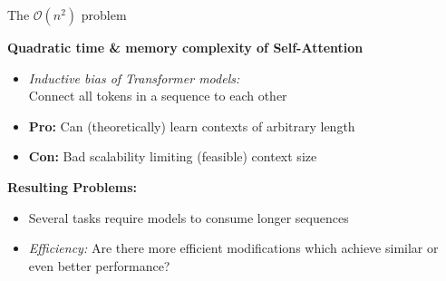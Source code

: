\documentclass[11pt,compress,t,notes=noshow, xcolor=table]{beamer}
\begin{document}


\begin{frame}{The $\mathcal{O}(n^2)$ problem}

\vfill

\textbf{Quadratic time \& memory complexity of Self-Attention}

\begin{itemize}
	\item \textit{Inductive bias of Transformer models:}\\
				Connect all tokens in a sequence to each other
	\item \textbf{Pro:} Can (theoretically) learn contexts of arbitrary length
	\item \textbf{Con:} Bad scalability limiting (feasible) context size
\end{itemize}

\vspace{.3cm}

\textbf{Resulting Problems:}

\begin{itemize}
	\item Several tasks require models to consume longer sequences
	\item \textit{Efficiency:} Are there more efficient modifications which achieve similar or even better performance? 
\end{itemize}
	
\vfill

\end{frame}

\end{document}
